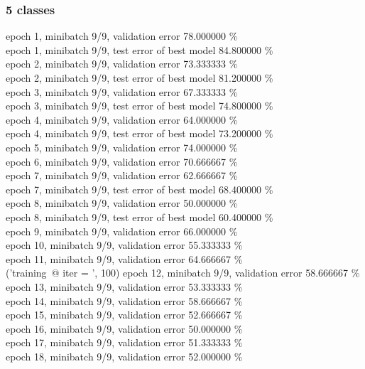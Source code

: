 \documentclass[a4paper]{article}
\begin{document}
\subsubsection{5 classes}
epoch 1, minibatch 9/9, validation error 78.000000 \% \\
     epoch 1, minibatch 9/9, test error of best model 84.800000 \% \\
epoch 2, minibatch 9/9, validation error 73.333333 \% \\
     epoch 2, minibatch 9/9, test error of best model 81.200000 \% \\
epoch 3, minibatch 9/9, validation error 67.333333 \% \\
     epoch 3, minibatch 9/9, test error of best model 74.800000 \% \\
epoch 4, minibatch 9/9, validation error 64.000000 \% \\
     epoch 4, minibatch 9/9, test error of best model 73.200000 \% \\
epoch 5, minibatch 9/9, validation error 74.000000 \% \\
epoch 6, minibatch 9/9, validation error 70.666667 \% \\
epoch 7, minibatch 9/9, validation error 62.666667 \% \\
     epoch 7, minibatch 9/9, test error of best model 68.400000 \% \\
epoch 8, minibatch 9/9, validation error 50.000000 \% \\
     epoch 8, minibatch 9/9, test error of best model 60.400000 \% \\
epoch 9, minibatch 9/9, validation error 66.000000 \% \\
epoch 10, minibatch 9/9, validation error 55.333333 \% \\
epoch 11, minibatch 9/9, validation error 64.666667 \% \\
('training\ @ iter = ', 100)
epoch 12, minibatch 9/9, validation error 58.666667 \% \\
epoch 13, minibatch 9/9, validation error 53.333333 \% \\
epoch 14, minibatch 9/9, validation error 58.666667 \% \\
epoch 15, minibatch 9/9, validation error 52.666667 \% \\
epoch 16, minibatch 9/9, validation error 50.000000 \% \\
epoch 17, minibatch 9/9, validation error 51.333333 \% \\
epoch 18, minibatch 9/9, validation error 52.000000 \% \\
\end{document}
